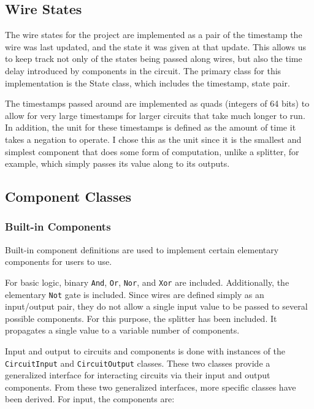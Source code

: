 \documentclass{article}
\newcommand{\ClassName}[1]{\texttt{#1}}
\begin{document}
\subsection{Wire States}

The wire states for the project are implemented as a pair of the timestamp the wire was last updated, and the state it was given at that update. This allows us to keep track not only of the states being passed along wires, but also the time delay introduced by components in the circuit. The primary class for this implementation is the State class, which includes the timestamp, state pair.

The timestamps passed around are implemented as quads (integers of 64 bits) to allow for very large timestamps for larger circuits that take much longer to run. In addition, the unit for these timestamps is defined as the amount of time it takes a negation to operate. I chose this as the unit since it is the smallest and simplest component that does some form of computation, unlike a splitter, for example, which simply passes its value along to its outputs.

\subsection{Component Classes}

\subsubsection{Built-in Components}

Built-in component definitions are used to implement certain elementary components for users to use.

For basic logic, binary \ClassName{And}, \ClassName{Or}, \ClassName{Nor}, and \ClassName{Xor} are included. Additionally,  the elementary \ClassName{Not} gate is included. Since wires are defined simply as an input/output pair, they do not allow a single input value to be passed to several possible components. For this purpose, the splitter has been included. It propagates a single value to a variable number of components.

Input and output to circuits and components is done with instances of the \ClassName{CircuitInput} and \ClassName{CircuitOutput} classes. These two classes provide a generalized interface for interacting circuits via their input and output components. From these two generalized interfaces, more specific classes have been derived. For input, the components are:
\end{document}
